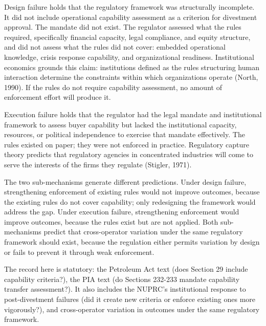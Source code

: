 \documentclass[twoside,fontset=lmodern]{mitthesis}
\begin{document}
Design failure holds that the regulatory framework was structurally
incomplete. It did not include operational capability assessment as a
criterion for divestment approval. The mandate did not exist. The
regulator assessed what the rules required, specifically financial
capacity, legal compliance, and equity structure, and did not assess
what the rules did not cover: embedded operational knowledge, crisis
response capability, and organizational readiness. Institutional
economics grounds this claim: institutions defined as the rules
structuring human interaction determine the constraints within which
organizations operate (North, 1990). If the rules do not require
capability assessment, no amount of enforcement effort will produce it.

Execution failure holds that the regulator had the legal mandate and
institutional framework to assess buyer capability but lacked the
institutional capacity, resources, or political independence to exercise
that mandate effectively. The rules existed on paper; they were not
enforced in practice. Regulatory capture theory predicts that regulatory
agencies in concentrated industries will come to serve the interests of
the firms they regulate (Stigler, 1971).

The two sub-mechanisms generate different predictions. Under design
failure, strengthening enforcement of existing rules would not improve
outcomes, because the existing rules do not cover capability; only
redesigning the framework would address the gap. Under execution
failure, strengthening enforcement would improve outcomes, because the
rules exist but are not applied. Both sub-mechanisms predict that
cross-operator variation under the same regulatory framework should
exist, because the regulation either permits variation by design or
fails to prevent it through weak enforcement.

The record here is statutory: the Petroleum Act text (does Section 29
include capability criteria?), the PIA text (do Sections 232-233 mandate
capability transfer assessment?). It also includes the NUPRC's
institutional response to post-divestment failures (did it create new
criteria or enforce existing ones more vigorously?), and cross-operator
variation in outcomes under the same regulatory framework.
\end{document}
